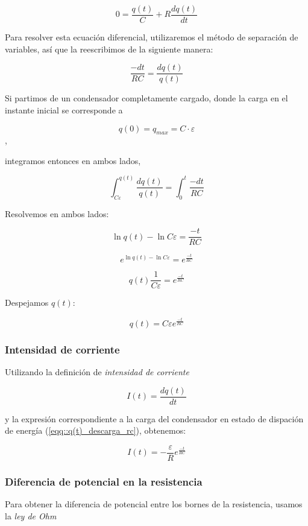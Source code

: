 \documentclass[../main.tex]{subfiles}
\begin{document}
$$0 = \frac{q(t)}{C} + R\frac{d q(t)}{d t}$$

Para resolver esta ecuación diferencial, utilizaremos el método de separación de variables, así que la reescribimos de la siguiente manera:

$$\frac{-d t}{RC} = \frac{d q(t)}{q(t)}$$

Si partimos de un condensador completamente cargado, donde la carga en el instante inicial se corresponde a 

$$q(0) = q_{max} = C \cdot \varepsilon$$,

integramos entonces en ambos lados,

$$\int_{C\varepsilon}^{q(t)} \frac{d q(t)}{q(t)}  = \int_{0}^{t} \frac{-d t}{RC} $$

Resolvemos en ambos lados:


$$\ln{q(t)} - \ln{C\varepsilon} = \frac{-t}{RC}$$

{\large
$$ e^{\ln{q(t)} - \ln{C\varepsilon}} = e^{\frac{-t}{RC}}$$ }

$$q(t)\frac{1}{C\varepsilon} = e^{\frac{-t}{RC}} $$

Despejamos $q(t)$:

\begin{equation}
    q(t) = C \varepsilon e^{\frac{-t}{RC}}
    \label{eqq::q(t)_descarga_rc}
\end{equation}


\subsubsection{Intensidad de corriente}
\label{part::descarga_condensador_2}
Utilizando la definición de \textit{intensidad de corriente}

$$I(t) = \frac{d q(t)}{d t}$$

y la expresión correspondiente a la carga del condensador en estado de dispación de energía (\ref{eqq::q(t)_descarga_rc}), obtenemos:

\begin{equation}
    I(t) = -\frac{\varepsilon}{R} e^{\frac{-t}{RC}} 
\end{equation}



\subsubsection{Diferencia de potencial en la resistencia}
\label{part::descarga_condensador_3}
Para obtener la diferencia de potencial entre los bornes de la resistencia, usamos la \textit{ley de Ohm}
\end{document}
